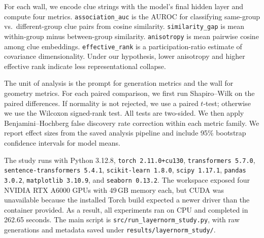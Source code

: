  For each wall, we encode clue strings with the model's final hidden layer and compute four metrics. \texttt{association\_auc} is the AUROC for classifying same-group vs.\ different-group clue pairs from cosine similarity. \texttt{similarity\_gap} is mean within-group minus between-group similarity. \texttt{anisotropy} is mean pairwise cosine among clue embeddings. \texttt{effective\_rank} is a participation-ratio estimate of covariance dimensionality. Under our hypothesis, lower anisotropy and higher effective rank indicate less representational collapse.

 The unit of analysis is the prompt for generation metrics and the wall for geometry metrics. For each paired comparison, we first run Shapiro--Wilk on the paired differences. If normality is not rejected, we use a paired $t$-test; otherwise we use the Wilcoxon signed-rank test. All tests are two-sided. We then apply Benjamini--Hochberg false discovery rate correction within each metric family. We report effect sizes from the saved analysis pipeline and include 95\% bootstrap confidence intervals for model means.

 The study runs with Python 3.12.8, \texttt{torch 2.11.0+cu130}, \texttt{transformers 5.7.0}, \texttt{sentence-transformers 5.4.1}, \texttt{scikit-learn 1.8.0}, \texttt{scipy 1.17.1}, \texttt{pandas 3.0.2}, \texttt{matplotlib 3.10.9}, and \texttt{seaborn 0.13.2}. The workspace exposed four NVIDIA RTX A6000 GPUs with 49\,GB memory each, but CUDA was unavailable because the installed Torch build expected a newer driver than the container provided. As a result, all experiments ran on CPU and completed in 262.65 seconds. The main script is \texttt{src/run\_layernorm\_study.py}, with raw generations and metadata saved under \texttt{results/layernorm\_study/}.

